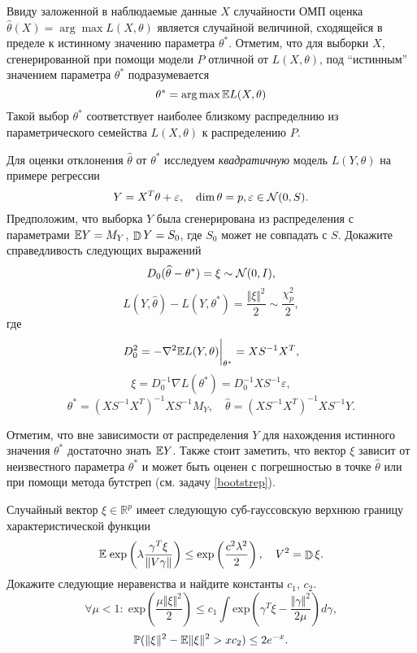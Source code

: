 \begin{problem}
\label{mle_square}
Ввиду заложенной в наблюдаемые данные $X$ случайности ОМП оценка $\widehat{\theta}(X) = \arg\max L(X,\theta)$ является случайной величиной, сходящейся в пределе к истинному значению параметра $\theta^*$. Отметим, что для выборки $X$, сгенерированной при помощи модели $P$ отличной от $L(X,\theta)$, под ``истинным'' значением параметра $\theta^*$ подразумевается 
\[
\theta^* = \arg\max \mathrm{{\mathbb E}} L(X,\theta)
\]
Такой выбор $\theta^*$ соответствует наиболее близкому распределнию из параметрического семейства $L(X,\theta)$ к распределению $P$. 

Для оценки отклонения $\widehat{\theta}$ от $\theta^*$ исследуем \textit{квадратичную}  модель $L(Y,\theta)$ на примере регрессии
\[
Y = X^{T} \theta + \varepsilon,
\quad 
\dim \theta = p,
\varepsilon \in \mathcal{N}(0, S).  
\]  
Предположим, что выборка $Y$ была сгенерирована из распределения с параметрами $\mathrm{{\mathbb E}} Y = M_Y$, $\mathop{\mathbb{D}}\nolimits Y = S_0$, где $S_0$ может не совпадать с $S$. Докажите справедливость следующих выражений 
\[
D_0 (\widehat{\theta} - \theta^*) = \xi \sim \mathcal{N}(0, I),
\]
\[
L(Y,\widehat{\theta}) - L(Y, \theta^*) = \frac{\Vert \xi \Vert^2}{2} \sim \frac{\chi^2_{p}}{2}, 
\]
где 
\[
D_0^2 = -\nabla^2 \mathrm{{\mathbb E}} L(Y, \theta) \bigg |_{\theta^*} = X S^{-1} X^{T},
\]
\[
\xi = D_0^{-1} \nabla L(\theta^*) = D_0^{-1} X S^{-1} \varepsilon,
\]
\[
\theta^{*} = (X S^{-1} X^{T})^{-1} X S^{-1} M_Y, \quad \widehat{\theta} = (X S^{-1} X^{T})^{-1} X S^{-1} Y.
\]

\begin{remark}
Отметим, что вне зависимости от распределения $Y$ для нахождения истинного значения $\theta^{*}$ достаточно знать $\mathrm{{\mathbb E}} Y$.  Также стоит заметить, что вектор $\xi$ зависит от неизвестного параметра $\theta^{*}$  и может быть оценен с погрешностью в точке $\widehat{\theta}$ или при помощи метода бутстреп (см. задачу \ref{bootstrep}). 
\end{remark}

\end{problem}

\begin{problem}
Случайный вектор $\xi \in \mathbb{R}^p$ имеет следующую суб-гауссовскую верхнюю границу характеристической функции
\[
\mathrm{{\mathbb E}} \; \text{exp} \left( \lambda \frac{\gamma^{T} \xi}{\Vert V \gamma \Vert}\right) \leq \text{exp} \left(\frac{c^2 \lambda^2}{2} \right), \quad 
V^2 = \mathop{\mathbb{D}}\nolimits \xi.
\]  
Докажите следующие неравенства и найдите константы $c_1$, $c_2$.
\[
\forall \mu < 1: \; \text{exp} \left( \frac{\mu  \Vert \xi \Vert^2 }{2} \right) \leq c_1 \int \text{exp} \left( 
\gamma^{T} \xi -  \frac{  \Vert \gamma \Vert^2 }{2 \mu } \right) d \gamma, 
\]
\[
\mathrm{{\mathbb P}}( \Vert \xi \Vert^2 - \mathrm{{\mathbb E}} \Vert \xi \Vert^2 > x c_2 ) \leq 2 e^{-x}.
\]
\end{problem}


